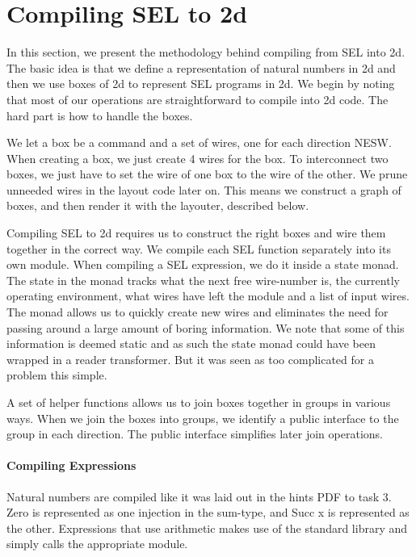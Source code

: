 
\section{Compiling SEL to 2d}
\label{sec:compiling-sel-2d}

In this section, we present the methodology behind compiling from SEL
into 2d. The basic idea is that we define a representation of natural
numbers in 2d and then we use boxes of 2d to represent SEL programs in
2d. We begin by noting that most of our operations are straightforward
to compile into 2d code. The hard part is how to handle the boxes.

We let a box be a command and a set of wires, one for each direction
NESW. When creating a box, we just create 4 wires for the box. To
interconnect two boxes, we just have to set the wire of one box to the
wire of the other. We prune unneeded wires in the layout code later
on. This means we construct a graph of boxes, and then render it with
the layouter, described below.

Compiling SEL to 2d requires us to construct the right boxes and wire
them together in the correct way. We compile each SEL function
separately into its own module. When compiling a SEL expression, we do
it inside a state monad. The state in the monad tracks what the next
free wire-number is, the currently operating environment, what wires
have left the module and a list of input wires. The monad allows us to
quickly create new wires and eliminates the need for passing around a
large amount of boring information. We note that some of this
information is deemed static and as such the state monad could have
been wrapped in a reader transformer. But it was seen as too
complicated for a problem this simple.

A set of helper functions allows us to join boxes together in groups
in various ways. When we join the boxes into groups, we identify a
public interface to the group in each direction. The public interface
simplifies later join operations.


\paragraph{Compiling Expressions}
\label{sec:compiling-numbers}

Natural numbers are compiled like it was laid out in the hints PDF to
task 3. Zero is represented as one injection in the sum-type, and Succ
x is represented as the other. Expressions that use arithmetic makes
use of the standard library and simply calls the appropriate module.

